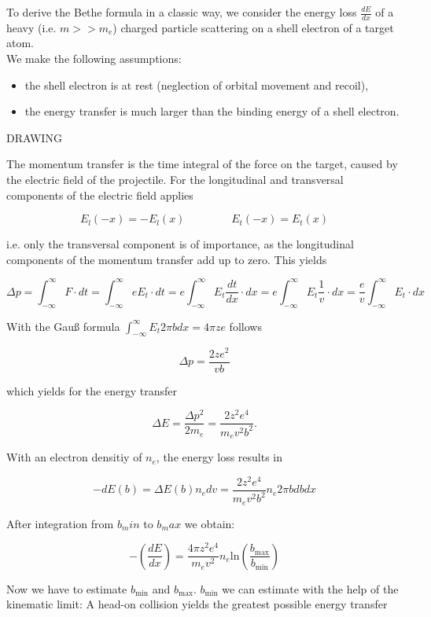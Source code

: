 To derive the Bethe formula in a classic way, we consider the energy loss $\frac{dE}{dx}$ of a heavy
(i.e. $m>>m_e$) charged particle scattering on a shell electron of a target atom.
\\
We make the following assumptions:

\begin{itemize}
  \item the shell electron is at rest (neglection of orbital movement and recoil),
  \item the energy transfer is much larger than the binding energy of a shell electron.
\end{itemize}

{\Huge DRAWING}

The momentum transfer is the time integral of the force on the target, caused by the electric field
of the projectile. For the longitudinal and transversal components of the electric field applies

\[E_l(-x)=-E_l(x)~~~~~~~~~~~~~~~~~~~E_t(-x)=E_t(x)\]

i.e. only the transversal component is of importance, as the longitudinal components of the momentum
transfer add up to zero. This yields

\[\Delta p= \int_{-\infty}^{\infty}F\cdot dt = \int_{-\infty}^{\infty}eE_t\cdot dt =
e\int_{-\infty}^{\infty}E_t\frac{dt}{dx}\cdot dx
=e\int_{-\infty}^{\infty}E_t\frac{1}{v}\cdot dx
=\frac{e}{v}\int_{-\infty}^{\infty}E_t\cdot dx\]

With the Gauß formula $\int_{-\infty}^{\infty}E_t2\pi bdx=4\pi ze$ follows

\[\Delta p = \frac{2ze^2}{vb}\]

which yields for the energy transfer

\[\Delta E=\frac{\Delta p^2}{2m_e}=\frac{2z^2e^4}{m_ev^2b^2} .\]

With an electron densitiy of $n_e$, the energy loss results in 

\[-dE(b)=\Delta E(b)n_edv=\frac{2z^2e^4}{m_ev^2b^2}n_e2\pi b db dx\]

After integration from $b_min$ to $b_max$ we obtain:

\[-\left(\frac{dE}{dx}\right)=\frac{4\pi z^2
e^4}{m_ev^2}n_e\text{ln}\left(\frac{b_{\text{max}}}{b_{\text{min}}}\right)\]

Now we have to estimate $b_{\text{min}}$ and $b_{\text{max}}$. $b_{\text{min}}$ we can estimate with
the help of the kinematic limit: A head-on collision yields the greatest possible energy transfer


